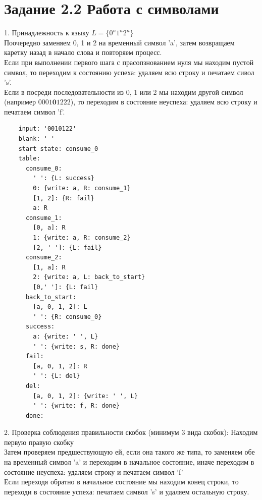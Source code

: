 \documentclass[12pt]{article}
\begin{document}
	\section*{Задание 2.2 Работа с символами}
	1. Принадлежность к языку $L = \{0^n1^n2^n\}$\\
	\indent Поочередно заменяем 0, 1 и 2 на временный символ 'a', затем возвращаем каретку назад в начало слова и повторяем процесс.\\
	\indent Если при выполнении первого шага с прасопзнованием нуля мы находим пустой символ, то переходим к состоянию успеха: удаляем всю строку и печатаем сивол 's'.\\
	\indent Если в посреди последовательности из 0, 1 или 2 мы находим другой символ (например $0001\boldsymbol{0}1222$), то переходим в состояние неуспеха: удаляем всю строку и печатаем символ 'f'.
	\begin{lstlisting}
	input: '0010122'
	blank: ' '
	start state: consume_0
	table:
	  consume_0:
	    ' ': {L: success}
	    0: {write: a, R: consume_1}
	    [1, 2]: {R: fail}
	    a: R
	  consume_1:
	    [0, a]: R
	    1: {write: a, R: consume_2}
	    [2, ' ']: {L: fail}
	  consume_2:
	    [1, a]: R
	    2: {write: a, L: back_to_start}
	    [0,' ']: {L: fail}
	  back_to_start:
	    [a, 0, 1, 2]: L
	    ' ': {R: consume_0}
	  success:
	    a: {write: ' ', L}
	    ' ': {write: s, R: done}
	  fail:
	    [a, 0, 1, 2]: R
	    ' ': {L: del}
	  del:
	    [a, 0, 1, 2]: {write: ' ', L}
	    ' ': {write: f, R: done}
	  done:
	\end{lstlisting}
	2. Проверка соблюдения правильности скобок (минимум 3 вида скобок):
	\indent Находим первую правую скобку\\
	\indent Затем проверяем предшествующую ей, если она такого же типа, то заменяем обе на временный символ 'a' и переходим в начальное состояние, иначе переходим в состояние неуспеха: удаляем строку и печатаем символ 'f'\\
	\indent Если переходя обратно в начальное состояние мы находим конец строки, то переходи в состояние успеха: печатаем символ 's' и удаляем остальную строку.
\end{document}
